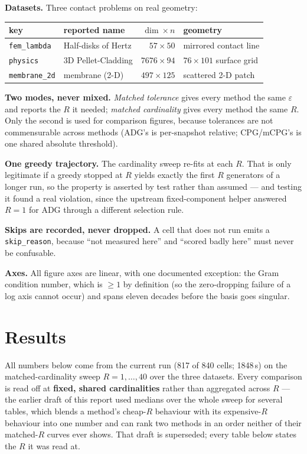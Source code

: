 \documentclass[11pt,a4paper]{article}
\begin{document}
\textbf{Datasets.} Three contact problems on real geometry:

\begin{center}
\begin{tabular}{@{}llrl@{}}
\toprule
key & reported name & $\dim\times n$ & geometry \\
\midrule
\texttt{fem\_lambda}  & Half-disks of Hertz  & $57\times 50$   & mirrored contact line \\
\texttt{physics}      & 3D Pellet-Cladding   & $7676\times 94$ & $76\times101$ surface grid \\
\texttt{membrane\_2d} & membrane (2-D)       & $497\times125$  & scattered 2-D patch \\
\bottomrule
\end{tabular}
\end{center}

\textbf{Two modes, never mixed.} \emph{Matched tolerance} gives every method the same
$\varepsilon$ and reports the $R$ it needed; \emph{matched cardinality} gives every method
the same $R$. Only the second is used for comparison figures, because tolerances are not
commensurable across methods (ADG's is per-snapshot relative; CPG/mCPG's is one shared
absolute threshold).

\textbf{One greedy trajectory.} The cardinality sweep re-fits at each $R$. That is only
legitimate if a greedy stopped at $R$ yields exactly the first $R$ generators of a longer
run, so the property is asserted by test rather than assumed --- and testing it found a
real violation, since the upstream fixed-component helper answered $R=1$ for ADG through a
different selection rule.

\textbf{Skips are recorded, never dropped.} A cell that does not run emits a
\texttt{skip\_reason}, because ``not measured here'' and ``scored badly here'' must never
be confusable.

\textbf{Axes.} All figure axes are linear, with one documented exception: the Gram
condition number, which is $\ge1$ by definition (so the zero-dropping failure of a log
axis cannot occur) and spans eleven decades before the basis goes singular.

\section{Results}\label{sec:results}

All numbers below come from the current run (817 of 840 cells; 1848\,s) on the
matched-cardinality sweep $R=1,\dots,40$ over the three datasets. Every comparison is
read off at \textbf{fixed, shared cardinalities} rather than aggregated across $R$ ---
the earlier draft of this report used medians over the whole sweep for several tables,
which blends a method's cheap-$R$ behaviour with its expensive-$R$ behaviour into one
number and can rank two methods in an order neither of their matched-$R$ curves ever
shows. That draft is superseded; every table below states the $R$ it was read at.
\end{document}
